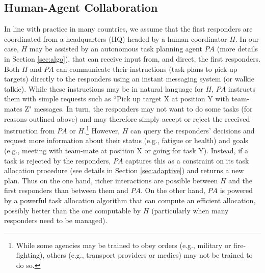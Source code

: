 %
\subsection{Human-Agent Collaboration}
\noindent In line with practice in many countries, we assume that the first responders are coordinated from a headquarters (HQ) headed by a human coordinator $H$. In our case, $H$ may be assisted by an autonomous task planning agent $PA$ (more details in Section \ref{sec:algo}), that can receive input from, and direct, the first responders.   Both  $H$ and $PA$  can communicate their  instructions (task plans to pick up targets) directly to the responders using an instant messaging system (or walkie talkie).  While these instructions may be in natural language for $H$, $PA$ instructs them with simple requests such as ``Pick up target X at position Y with team-mates Z" messages. In turn, the responders may not want to do some tasks (for reasons outlined above) and may therefore simply accept or reject the received instruction from $PA$ or $H$.\footnote{While some agencies may be trained to obey orders (e.g., military or fire-fighting), others (e.g., transport providers or medics) may not be trained to do so.} However, $H$ can query the responders' decisions and request  more information about their status (e.g., fatigue or health) and goals (e.g., meeting with team-mate at position X or going for task Y). Instead, if a task is rejected by the responders, $PA$ captures this as a constraint on its task allocation procedure (see details in Section \ref{sec:adaptive}) and returns a new plan. Thus on the one hand, richer interactions are possible between $H$ and the first responders than between them and $PA$. On the other hand, $PA$ is powered by a powerful task allocation algorithm that can compute an efficient allocation, possibly better than the one computable by $H$ (particularly when many responders need to be managed). 

